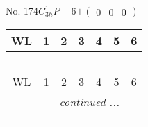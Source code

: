 \documentclass[fleqn,9pt,landscape]{jsarticle}
\begin{document}
\newpage
No. 174\quad$C_{3h}^{1}$\quad$P-6$\quad[ hexagonal ]\quad$+\begin{pmatrix} 0 & 0 & 0 \end{pmatrix}$
\begin{center}
\renewcommand{\arraystretch}{1.2}
\begin{longtable}{ccccccc}
 \hline \hline
WL & 1 & 2 & 3 & 4 & 5 & 6 \\ \hline \endfirsthead

\multicolumn{6}{l}{\tablename\ \thetable{}} \\
 \hline \hline
WL & 1 & 2 & 3 & 4 & 5 & 6 \\ \hline \endhead

 \hline \hline
\multicolumn{6}{r}{\footnotesize\it continued ...} \\ \endfoot

 \hline \hline
\multicolumn{6}{r}{} \\ \endlastfoot


\end{longtable}
\end{center}
\end{document}
